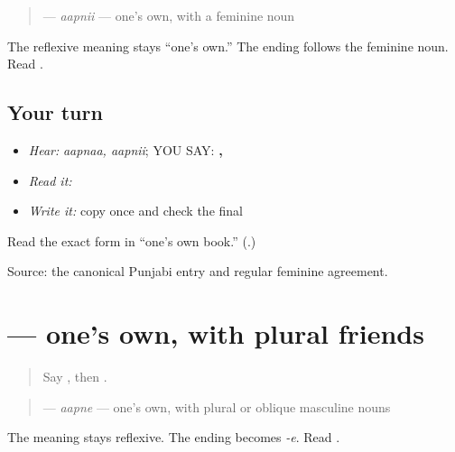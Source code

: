 \begin{grammarlens}[title={Grammar Lens: the same \emph{-ii} agreement}]
\begin{quote}
\textbf{} — \emph{aapnii} — one's own, with a feminine noun
\end{quote}

The reflexive meaning stays “one's own.” The ending follows the feminine noun. Read \textbf{ }.
\end{grammarlens}

\subsection*{Your turn}
\begin{itemize}
\raggedright
  \item \emph{Hear:} \emph{aapnaa, aapnii}; YOU SAY: \textbf{, }
  \item \emph{Read it:} \textbf{ }
  \item \emph{Write it:} copy \textbf{} once and check the final \textbf{}
\end{itemize}

\begin{tcolorbox}[breakable,colback=teal!4,colframe=teal!35!black,title={Before you move on}]
Read the exact form in “one's own book.” (\textbf{}.)

Source: the canonical Punjabi \textbf{} entry and regular feminine agreement.
\end{tcolorbox}
\section[\texorpdfstring{\pa{ਆਪਣੇ} (aapne)}{ਆਪਣੇ (aapne)}]{ — one's own, with plural friends}

\label{lesson:PA-C185-apne}



\begin{quote}
Say \textbf{}, then \textbf{}.
\end{quote}

\begin{grammarlens}[title={Grammar Lens: use the \emph{-e} agreement form}]
\begin{quote}
\textbf{} — \emph{aapne} — one's own, with plural or oblique masculine nouns
\end{quote}

The meaning stays reflexive. The ending becomes \emph{-e}. Read \textbf{ }.
\end{grammarlens}


